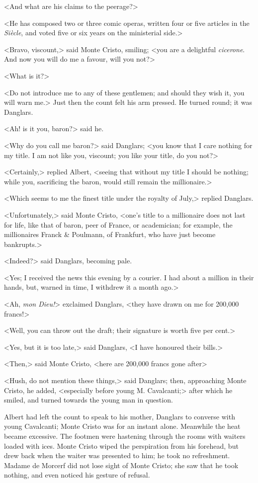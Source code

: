 <And what are his claims to the peerage?> 

 <He has composed two or three comic operas, written four or five articles in the \textit{Siècle}, and voted five or six years on the ministerial side.> 

 <Bravo, viscount,> said Monte Cristo, smiling; <you are a delightful \textit{cicerone}. And now you will do me a favour, will you not?> 

 <What is it?> 

 <Do not introduce me to any of these gentlemen; and should they wish it, you will warn me.> Just then the count felt his arm pressed. He turned round; it was Danglars. 

 <Ah! is it you, baron?> said he. 

 <Why do you call me baron?> said Danglars; <you know that I care nothing for my title. I am not like you, viscount; you like your title, do you not?> 

 <Certainly,> replied Albert, <seeing that without my title I should be nothing; while you, sacrificing the baron, would still remain the millionaire.> 

 <Which seems to me the finest title under the royalty of July,> replied Danglars. 

 <Unfortunately,> said Monte Cristo, <one's title to a millionaire does not last for life, like that of baron, peer of France, or academician; for example, the millionaires Franck \& Poulmann, of Frankfurt, who have just become bankrupts.> 

 <Indeed?> said Danglars, becoming pale. 

 <Yes; I received the news this evening by a courier. I had about a million in their hands, but, warned in time, I withdrew it a month ago.> 

 <Ah, \textit{mon Dieu!}> exclaimed Danglars, <they have drawn on me for 200,000 francs!> 

 <Well, you can throw out the draft; their signature is worth five per cent.> 

 <Yes, but it is too late,> said Danglars, <I have honoured their bills.> 

 <Then,> said Monte Cristo, <here are 200,000 francs gone after\longdash> 

 <Hush, do not mention these things,> said Danglars; then, approaching Monte Cristo, he added, <especially before young M. Cavalcanti;> after which he smiled, and turned towards the young man in question. 

 Albert had left the count to speak to his mother, Danglars to converse with young Cavalcanti; Monte Cristo was for an instant alone. Meanwhile the heat became excessive. The footmen were hastening through the rooms with waiters loaded with ices. Monte Cristo wiped the perspiration from his forehead, but drew back when the waiter was presented to him; he took no refreshment. Madame de Morcerf did not lose sight of Monte Cristo; she saw that he took nothing, and even noticed his gesture of refusal. 

